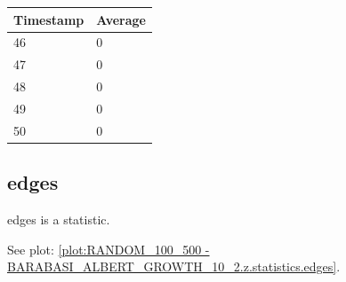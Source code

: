 \begin{tabular}{|l||l|}
\hline
	\textbf{Timestamp} & \textbf{Average} \\ \hline
	46 & 0 \\ \hline
	47 & 0 \\ \hline
	48 & 0 \\ \hline
	49 & 0 \\ \hline
	50 & 0 \\ \hline
\end{tabular}

\subsection{edges}
edges is a statistic.

See plot: \ref{plot:RANDOM_100_500 - BARABASI_ALBERT_GROWTH_10_2.z.statistics.edges}.

